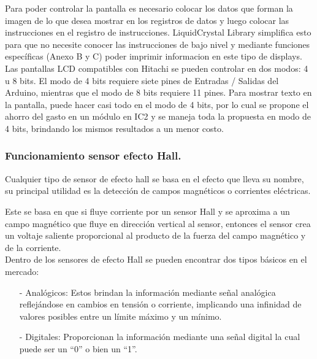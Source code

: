 \documentclass[11pt,letter
								]
								{article}
\begin{document}
Para poder controlar la pantalla es necesario colocar los datos que forman la imagen de lo que desea mostrar en los registros de datos y luego colocar las instrucciones en el registro de instrucciones. LiquidCrystal Library simplifica esto para que no necesite conocer las instrucciones de bajo nivel y mediante funciones específicas (Anexo B y C) poder imprimir informacion en este tipo de displays.\\
Las pantallas LCD compatibles con Hitachi se pueden controlar en dos modos: 4 u 8 bits. El modo de 4 bits requiere siete pines de Entradas / Salidas  del Arduino, mientras que el modo de 8 bits requiere 11 pines.\cite{ATuto} Para mostrar texto en la pantalla, puede hacer casi todo en el modo de 4 bits, por lo cual se propone el ahorro   del gasto en un módulo en IC2 y se maneja toda la propuesta en modo de  4 bits, brindando los mismos resultados a un menor costo. \\


\newpage



\subsubsection{Funcionamiento sensor efecto Hall.}


Cualquier tipo de sensor de efecto hall se basa en el efecto que lleva su nombre, su principal utilidad es la detección de campos magnéticos o corrientes eléctricas.




Este se basa en que si fluye corriente por un sensor Hall y se aproxima a un campo magnético que fluye en dirección vertical al sensor, entonces el sensor crea un voltaje saliente proporcional al producto de la fuerza del campo magnético y de la corriente.\\

Dentro de los sensores de efecto Hall se pueden encontrar dos tipos básicos en el mercado:\\
\begin{itemize}
\item [-]Analógicos: Estos brindan la información mediante señal analógica reflejándose en cambios en tensión o corriente, implicando una infinidad de valores posibles entre un límite máximo y un mínimo. \cite{serna2010guia}\\

\item [-]Digitales:  Proporcionan la información mediante una señal digital la cual puede ser un ``0'' o bien un ``1''.
\end{itemize}
\end{document}
